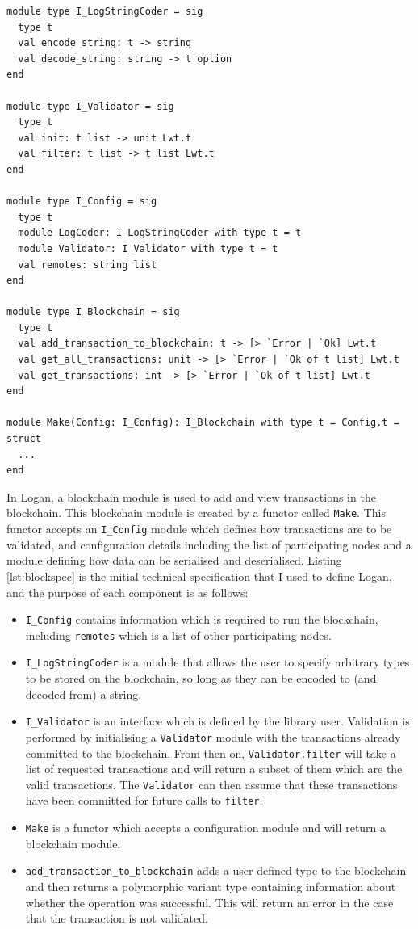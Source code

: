 \documentclass[12pt,a4paper,twoside,openright]{report}
\begin{document}
	\begin{lstlisting}[caption={Blockchain Specification},label={lst:blockspec},float,floatplacement=H]
module type I_LogStringCoder = sig
  type t
  val encode_string: t -> string
  val decode_string: string -> t option
end

module type I_Validator = sig 
  type t 
  val init: t list -> unit Lwt.t 
  val filter: t list -> t list Lwt.t
end

module type I_Config = sig
  type t
  module LogCoder: I_LogStringCoder with type t = t
  module Validator: I_Validator with type t = t
  val remotes: string list
end

module type I_Blockchain = sig
  type t
  val add_transaction_to_blockchain: t -> [> `Error | `Ok] Lwt.t
  val get_all_transactions: unit -> [> `Error | `Ok of t list] Lwt.t
  val get_transactions: int -> [> `Error | `Ok of t list] Lwt.t
end

module Make(Config: I_Config): I_Blockchain with type t = Config.t = struct 
  ...
end
	\end{lstlisting}
	In Logan, a blockchain module is used to add and view transactions in the blockchain.
	This blockchain module is created by a functor called \texttt{Make}.
	This functor accepts an \texttt{I\_Config} module which defines how transactions are to be validated, and configuration details including the list of participating nodes and a module defining how data can be serialised and deserialised.
	Listing \ref{lst:blockspec} is the initial technical specification that I used to define Logan, and the purpose of each component is as follows: 
	\begin{itemize}
		\item \texttt{I\_Config} contains information which is required to run the blockchain, including \texttt{remotes} which is a list of other participating nodes.
		\item \texttt{I\_LogStringCoder} is a module that allows the user to specify arbitrary types to be stored on the blockchain, so long as they can be encoded to (and decoded from) a string.
		\item \texttt{I\_Validator} is an interface which is defined by the library user. 
		Validation is performed by initialising a \texttt{Validator} module with the transactions already committed to the blockchain.
		From then on, \texttt{Validator.filter} will take a list of requested transactions and will return a subset of them which are the valid transactions.
		The \texttt{Validator} can then assume that these transactions have been committed for future calls to \texttt{filter}.
		\item \texttt{Make} is a functor which accepts a configuration module and will return a blockchain module.
		\item \texttt{add\_transaction\_to\_blockchain} adds a user defined type to the blockchain and then returns a polymorphic variant type containing information about whether the operation was successful. 
		This will return an error in the case that the transaction is not validated.
	\end{itemize} 
\end{document}
